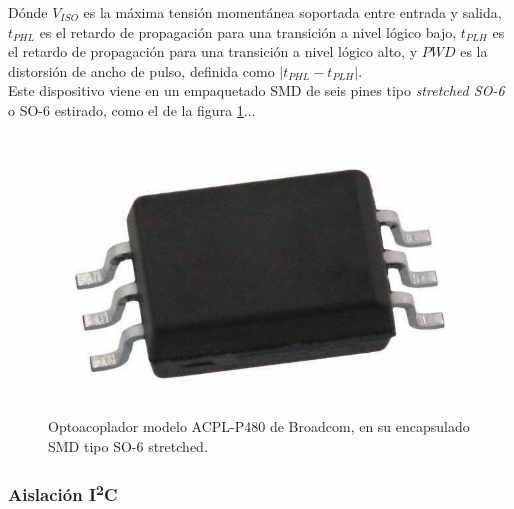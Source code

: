 Dónde $V_{ISO}$ es la máxima tensión momentánea soportada entre entrada y salida, $t_{PHL}$ es el retardo de propagación para una transición a nivel lógico bajo, $t_{PLH}$ es el retardo de propagación para una transición a nivel lógico alto, y $PWD$ es la distorsión de ancho de pulso, definida como $|t_{PHL} - t_{PLH}|$.\\

Este dispositivo viene en un empaquetado SMD de seis pines tipo \textit{stretched SO-6} o SO-6 estirado, como el de la figura \ref{encapsulado_opto}...\\

\begin{figure}[h]
    \centering
    \includegraphics[scale=0.2]{Imagenes/SO6 Stretched.jpeg}
    \caption{Optoacoplador modelo ACPL-P480 de Broadcom, en su encapsulado SMD tipo SO-6 stretched.}
    \label{encapsulado_opto}
\end{figure}

\subsubsection{Aislación I\textsuperscript{2}C}

\lipsum[2]\\

